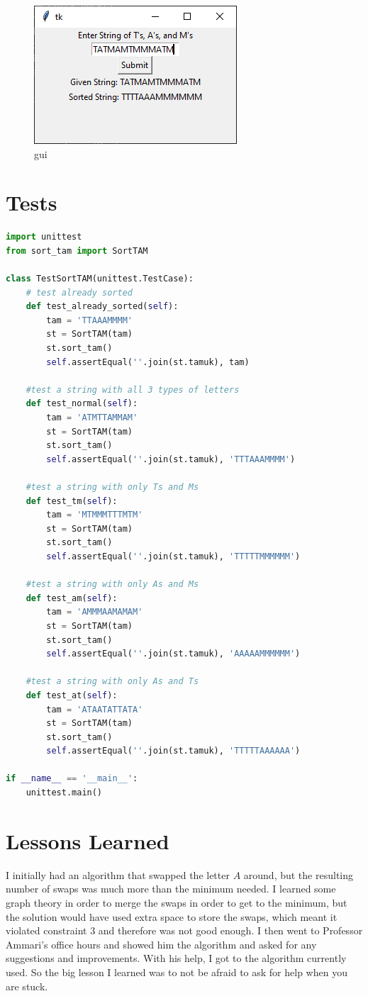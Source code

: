 \documentclass[12pt]{report}
\begin{document}
\begin{figure}[ht]
    \centering
    \includegraphics[]{gui}
    \caption{gui}
\end{figure}

\chapter{Tests}
\begin{lstlisting}[language=Python, caption=sort\_tam\_tests.py]
import unittest
from sort_tam import SortTAM

class TestSortTAM(unittest.TestCase):
    # test already sorted
    def test_already_sorted(self):
        tam = 'TTAAAMMMM'
        st = SortTAM(tam)
        st.sort_tam()
        self.assertEqual(''.join(st.tamuk), tam)
    
    #test a string with all 3 types of letters
    def test_normal(self):
        tam = 'ATMTTAMMAM'
        st = SortTAM(tam)
        st.sort_tam()
        self.assertEqual(''.join(st.tamuk), 'TTTAAAMMMM')
    
    #test a string with only Ts and Ms
    def test_tm(self):
        tam = 'MTMMMTTTMTM'
        st = SortTAM(tam)
        st.sort_tam()
        self.assertEqual(''.join(st.tamuk), 'TTTTTMMMMMM')
    
    #test a string with only As and Ms
    def test_am(self):
        tam = 'AMMMAAMAMAM'
        st = SortTAM(tam)
        st.sort_tam()
        self.assertEqual(''.join(st.tamuk), 'AAAAAMMMMMM')
    
    #test a string with only As and Ts
    def test_at(self):
        tam = 'ATAATATTATA'
        st = SortTAM(tam)
        st.sort_tam()
        self.assertEqual(''.join(st.tamuk), 'TTTTTAAAAAA')

if __name__ == '__main__':
    unittest.main()
\end{lstlisting}

\chapter{Lessons Learned}
I initially had an algorithm that swapped the letter $A$ around, but the resulting number of swaps was much more than the minimum needed. 
I learned some graph theory in order to merge the swaps in order to get to the minimum, 
but the solution would have used extra space to store the swaps, which meant it violated constraint 3 and therefore was not good enough.
I then went to Professor Ammari's office hours and showed him the algorithm and asked for any suggestions and improvements.
With his help, I got to the algorithm currently used. So the big lesson I learned was to not be afraid to ask for help when you are stuck.



 
\end{document}

